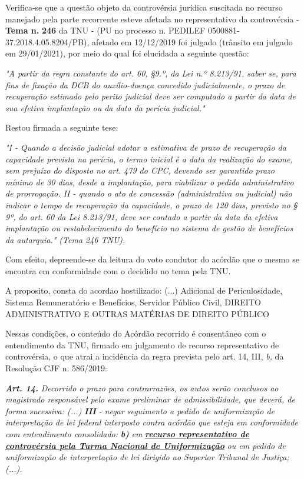 \documentclass[12pt]{article}
\begin{document}
\justifying
\noindent Verifica-se que a questão objeto da controvérsia jurídica suscitada no recurso manejado pela parte recorrente esteve afetada no representativo da controvérsia - \textbf{Tema n. }\textbf{246} da TNU - (PU no processo n. PEDILEF 0500881-37.2018.4.05.8204/PB),  afetado em 12/12/2019 foi julgado (trânsito em julgado em 29/01/2021), por meio do qual foi elucidada a seguinte questão:

\noindent \textit{"A partir da regra constante do art. 60, §9.º, da Lei n.º 8.213/91, saber se, para fins de fixação da DCB do auxílio-doença concedido judicialmente, o prazo de recuperação estimado pelo perito judicial deve ser computado a partir da data de sua efetiva implantação ou da data da perícia judicial."}

\noindent Restou firmada a seguinte tese:

\noindent \textit{"I - Quando a decisão judicial adotar a estimativa de prazo de recuperação da capacidade prevista na perícia, o termo inicial é a data da realização do exame, sem prejuízo do disposto no art. 479 do CPC, devendo ser garantido prazo mínimo de 30 dias, desde a implantação, para viabilizar o pedido administrativo de prorrogação. II - quando o ato de concessão (administrativa ou judicial) não indicar o tempo de recuperação da capacidade, o prazo de 120 dias, previsto no § 9º, do art. 60 da Lei 8.213/91, deve ser contado a partir da data da efetiva implantação ou restabelecimento do benefício no sistema de gestão de benefícios da autarquia." (Tema 246 TNU).}

\noindent Com efeito, depreende-se da leitura do voto condutor do acórdão que o mesmo se encontra em conformidade com o decidido no  tema pela TNU.

\noindent A proposito, consta do acordao hostilizado: (...) Adicional de Periculosidade, Sistema Remuneratório e Benefícios, Servidor Público Civil, DIREITO ADMINISTRATIVO E OUTRAS MATÉRIAS DE DIREITO PÚBLICO

\noindent Nessas condições, o conteúdo do Acórdão recorrido é consentâneo com o entendimento da TNU, firmado em julgamento de recurso representativo de controvérsia, o que atrai a incidência da regra prevista pelo art. 14, III, \textit{b,} da Resolução CJF n. 586/2019:

\noindent \textit{\textbf{Art. 14.}}\textit{ Decorrido o prazo para contrarrazões, os autos serão conclusos ao magistrado responsável pelo exame preliminar de admissibilidade, que deverá, de forma sucessiva: (...) }\textit{\textbf{III }}\textit{- negar seguimento a pedido de uniformização de interpretação de lei federal interposto contra acórdão que esteja em conformidade com entendimento consolidado: }\textit{\textbf{b)}}\textit{ em }\uline{\textit{\textbf{recurso representativo de controvérsia pela Turma Nacional de Uniformização}}}\textit{ ou em pedido de uniformização de interpretação de lei dirigido ao Superior Tribunal de Justiça;(...).}
\end{document}
